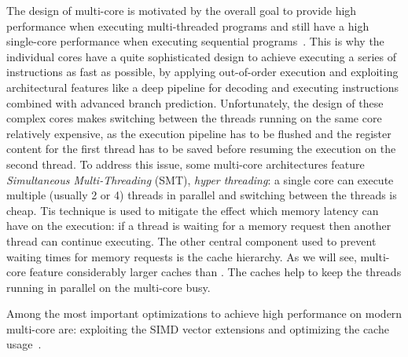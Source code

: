The design of multi-core \CPUs is motivated by the overall goal to provide high performance when executing multi-threaded programs and still have a high single-core performance when executing sequential programs~\cite{GarlandK10}.
This is why the individual cores have a quite sophisticated design to achieve executing a series of instructions as fast as possible, by applying out-of-order execution and exploiting architectural features like a deep pipeline for decoding and executing instructions combined with advanced branch prediction.
Unfortunately, the design of these complex cores makes switching between the threads running on the same core relatively expensive, as the execution pipeline has to be flushed and the register content for the first thread has to be saved before resuming the execution on the second thread.
To address this issue, some multi-core architectures feature \emph{Simultaneous Multi-Threading} (SMT), \aka \emph{hyper threading}:
a single \CPU core can execute multiple (usually 2 or 4) threads in parallel and switching between the threads is cheap.
Tis technique is used to mitigate the effect which memory latency can have on the execution:
if a thread is waiting for a memory request then another thread can continue executing.
The other central component used to prevent waiting times for memory requests is the cache hierarchy.
As we will see, multi-core \CPUs feature considerably larger caches than \GPUs.
The caches help to keep the threads running in parallel on the multi-core \CPU busy.

Among the most important optimizations to achieve high performance on modern multi-core \CPUs are:
exploiting the SIMD vector extensions and optimizing the cache usage~\cite{IntelCPUOptimizingGuide}.

